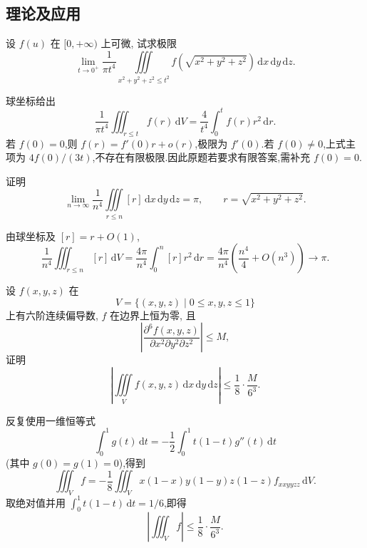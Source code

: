 \subsection{理论及应用}

\begin{example}
    设 $f(u)$ 在 $\lbrack0,+\infty)$ 上可微, 试求极限
    \[
        \displaystyle\lim\limits_{t\to0^+}\dfrac{1}{\pi t^4}
        \iiint\limits_{x^2+y^2+z^2\leq t^2}
        f\left(\sqrt{x^2+y^2+z^2}\right)\,\mathrm{d}x\,\mathrm{d}y\,\mathrm{d}z.
    \]
\end{example}
\exampleblank

\begin{solution}
    球坐标给出
    \[
        \dfrac{1}{\pi t^4}\iiint_{r\leq t}f(r)\,\mathrm{d}V
        =\dfrac{4}{t^4}\int_0^t f(r)r^2\,\mathrm{d}r.
    \]
    若 $f(0)=0$,则 $f(r)=f'(0)r+o(r)$,极限为 $f'(0)$.若 $f(0)\ne0$,上式主项为 $4f(0)/(3t)$,不存在有限极限.因此原题若要求有限答案,需补充 $f(0)=0$.
\end{solution}

\begin{example}[\markstar]
    证明
    \[
        \displaystyle\lim\limits_{n\to\infty}\dfrac{1}{n^4}
        \iiint\limits_{r\leq n}[r]\,\mathrm{d}x\,\mathrm{d}y\,\mathrm{d}z=\pi,
        \qquad r=\sqrt{x^2+y^2+z^2}.
    \]
\end{example}
\exampleblank

\begin{solution}
    由球坐标及 $[r]=r+O(1)$,
    \[
        \dfrac{1}{n^4}\iiint_{r\leq n}[r]\,\mathrm{d}V
        =\dfrac{4\pi}{n^4}\int_0^n[r]r^2\,\mathrm{d}r
        =\dfrac{4\pi}{n^4}\left(\dfrac{n^4}{4}+O(n^3)\right)\to\pi.
    \]
\end{solution}

\begin{example}
    设 $f(x,y,z)$ 在
    \[
        V=\{(x,y,z)\mid0\leq x,y,z\leq1\}
    \]
    上有六阶连续偏导数, $f$ 在边界上恒为零, 且
    \[
        \left|\dfrac{\partial^6f(x,y,z)}{\partial x^2\partial y^2\partial z^2}\right|\leq M,
    \]
    证明
    \[
        \left|\iiint\limits_Vf(x,y,z)\,\mathrm{d}x\,\mathrm{d}y\,\mathrm{d}z\right|
        \leq\dfrac{1}{8}\cdot\dfrac{M}{6^3}.
    \]
\end{example}
\exampleblank

\begin{solution}
    反复使用一维恒等式
    \[
        \displaystyle\int_0^1g(t)\,\mathrm{d}t=-\dfrac{1}{2}\int_0^1t(1-t)g''(t)\,\mathrm{d}t
    \]
    (其中 $g(0)=g(1)=0$),得到
    \[
        \displaystyle\iiint_Vf=-\dfrac{1}{8}\iiint_Vx(1-x)y(1-y)z(1-z)f_{xxyyzz}\,\mathrm{d}V.
    \]
    取绝对值并用 $\displaystyle\int_0^1t(1-t)\,\mathrm{d}t=1/6$,即得
    \[
        \left|\iiint_Vf\right|\leq\dfrac{1}{8}\cdot\dfrac{M}{6^3}.
    \]
\end{solution}

